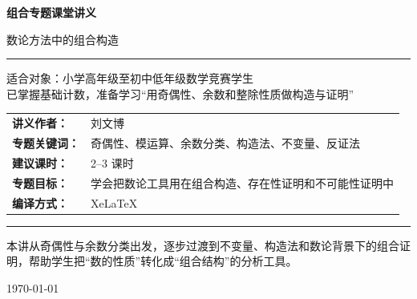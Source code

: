 \documentclass[11pt,a4paper,fontset=fandol]{ctexart}
\theoremstyle{formaltheorem}
\theoremstyle{formalexample}
\begin{document}
\thispagestyle{empty}
\begin{titlepage}
\centering
\vspace*{0.9cm}

\begin{tcolorbox}[
  enhanced,
  width=0.92\textwidth,
  colback=white,
  colframe=mainblue,
  boxrule=1pt,
  arc=0mm,
  left=6mm,
  right=6mm,
  top=8mm,
  bottom=8mm
]
\centering

{\fontsize{24}{30}\selectfont\bfseries 组合专题课堂讲义\par}
\vspace{0.7cm}
{\fontsize{17}{22}\selectfont 数论方法中的组合构造\par}

\vspace{1.1cm}
\color{rulegray}\rule{0.72\textwidth}{0.7pt}\par
\vspace{1cm}

\begin{tcolorbox}[colback=lightblue,colframe=mainblue,width=0.82\textwidth,boxrule=1pt]
\centering
{\Large 适合对象：小学高年级至初中低年级数学竞赛学生}\\[0.4em]
{\large 已掌握基础计数，准备学习“用奇偶性、余数和整除性质做构造与证明”}
\end{tcolorbox}

\vspace{1.2cm}

\renewcommand{\arraystretch}{1.42}
\begin{tabular}{>{\bfseries}p{3.5cm}p{8cm}}
讲义作者： & 刘文博 \\
专题关键词： & 奇偶性、模运算、余数分类、构造法、不变量、反证法 \\
建议课时： & 2--3 课时 \\
专题目标： & 学会把数论工具用在组合构造、存在性证明和不可能性证明中 \\
编译方式： & XeLaTeX \\
\end{tabular}

\vspace{1.2cm}
\color{rulegray}\rule{0.72\textwidth}{0.7pt}\par
\vspace{0.8cm}

{\normalsize 本讲从奇偶性与余数分类出发，逐步过渡到不变量、构造法和数论背景下的组合证明，帮助学生把“数的性质”转化成“组合结构”的分析工具。\par}

\vspace{0.5cm}
{\large \today\par}
\end{tcolorbox}
\end{titlepage}
\end{document}
